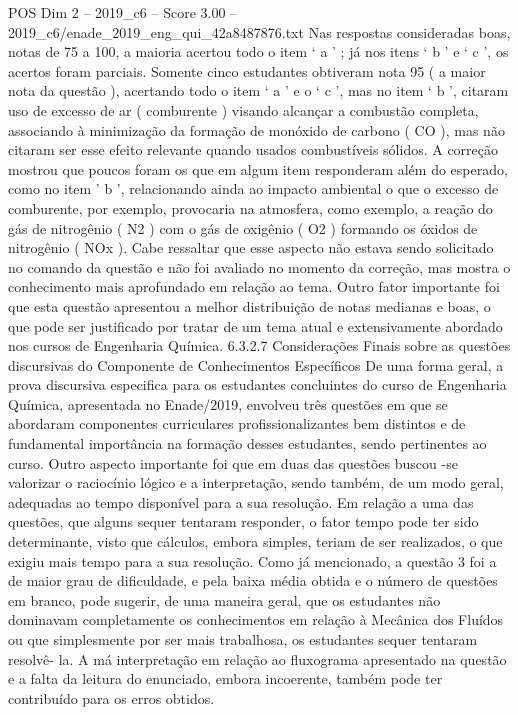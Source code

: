 \begin{textsample}{POS Dim 2 – 2019\_c6 – Score 3.00 – 2019\_c6/enade\_2019\_eng\_qui\_42a8487876.txt}
Nas respostas consideradas boas, notas de 75 a 100, a maioria acertou todo o item ‘ a ’ ; já nos itens ‘ b ’ e ‘ c ’, os acertos foram parciais.
Somente cinco estudantes obtiveram nota 95 ( a maior nota da questão ), acertando todo o item ‘ a ’ e o ‘ c ’, mas no item ‘ b ’, citaram uso de excesso de ar ( comburente ) visando alcançar a combustão completa, associando à minimização da formação de monóxido de carbono ( CO ), mas não citaram ser esse efeito relevante quando usados combustíveis sólidos.
A correção mostrou que poucos foram os que em algum item responderam além do esperado, como no item ’ b ’, relacionando ainda ao impacto ambiental o que o excesso de comburente, por exemplo, provocaria na atmosfera, como exemplo, a reação do gás de nitrogênio ( N2 ) com o gás de oxigênio ( O2 ) formando os óxidos de nitrogênio ( NOx ).
Cabe ressaltar que esse aspecto não estava sendo solicitado no comando da questão e não foi avaliado no momento da correção, mas mostra o conhecimento mais aprofundado em relação ao tema.
Outro fator importante foi que esta questão apresentou a melhor distribuição de notas medianas e boas, o que pode ser justificado por tratar de um tema atual e extensivamente abordado nos cursos de Engenharia Química. 6.3.2.7 Considerações Finais sobre as questões discursivas do Componente de Conhecimentos Específicos De uma forma geral, a prova discursiva especifica para os estudantes concluintes do curso de Engenharia Química, apresentada no Enade/2019, envolveu três questões em que se abordaram componentes curriculares profissionalizantes bem distintos e de fundamental importância na formação desses estudantes, sendo pertinentes ao curso.
Outro aspecto importante foi que em duas das questões buscou -se valorizar o raciocínio lógico e a interpretação, sendo também, de um modo geral, adequadas ao tempo disponível para a sua resolução.
Em relação a uma das questões, que alguns sequer tentaram responder, o fator tempo pode ter sido determinante, visto que cálculos, embora simples, teriam de ser realizados, o que exigiu mais tempo para a sua resolução.
Como já mencionado, a questão 3 foi a de maior grau de dificuldade, e pela baixa média obtida e o número de questões em branco, pode sugerir, de uma maneira geral, que os estudantes não dominavam completamente os conhecimentos em relação à Mecânica dos Fluídos ou que simplesmente por ser mais trabalhosa, os estudantes sequer tentaram resolvê- la.
A má interpretação em relação ao fluxograma apresentado na questão e a falta da leitura do enunciado, embora incoerente, também pode ter contribuído para os erros obtidos.

\end{textsample}
